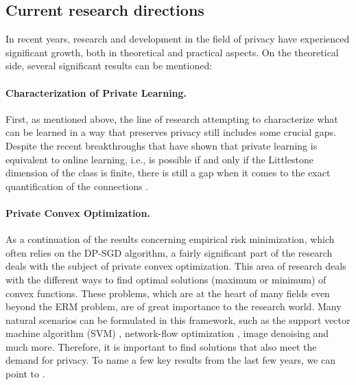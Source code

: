 \documentclass[12pt,a4paper,oneside,onecolumn]{book}
\begin{document}
\subsection{Current research directions}
In recent years, research and development in the field of privacy have experienced significant growth, both in theoretical and practical aspects. On the theoretical side, several significant results can be mentioned: 

\paragraph{Characterization of Private Learning.}
First, as mentioned above, the line of research attempting to characterize what can be learned in a way that preserves privacy still includes some crucial gaps. 
Despite the recent breakthroughs that have shown that private learning is equivalent to online learning, i.e., is possible if and only if the Littlestone dimension of the class is finite, there is still a gap when it comes to the exact quantification of the connections \citep{alon2022private, DBLP:journals/corr/abs-2012-03893}.

\paragraph{Private Convex Optimization.}
As a continuation of the results concerning empirical risk minimization, which often relies on the DP-SGD algorithm, a fairly significant part of the research deals with the subject of private convex optimization. 
This area of research deals with the different ways to find optimal solutions (maximum or minimum) of convex functions. These problems, which are at the heart of many fields even beyond the ERM problem, are of great importance to the research world. Many natural scenarios can be formulated in this framework, such as the support vector machine algorithm (SVM) \citep{shalev-shwartz_understanding_2014}, network-flow optimization \citep{wei2017optimal}, image denoising \citep{thanh2019review} and much more. 
Therefore, it is important to find solutions that also meet the demand for privacy. To name a few key results from the last few years, we can point to \citet{Kifer2012PrivateCE, Iyengar2019TowardsPD, Bassily2021NonEuclideanDP, Bassily2019PrivateSC, Feldman2020PrivateSC, Kulkarni2021PrivateNE, Wu2016DifferentiallyPS}.
\end{document}
